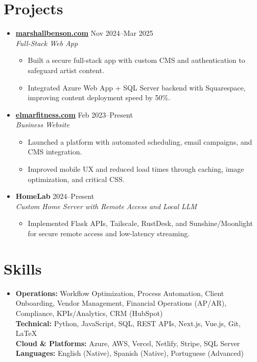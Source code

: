 \documentclass[letterpaper,10pt]{article}
\newcommand{\resumeItem}[1]{\item \small{#1}}
\begin{document}
\section*{Projects}
\begin{itemize}
  \item[]
    \textbf{\href{https://marshallbenson.com}{marshallbenson.com}} \hfill Nov 2024–Mar 2025 \\
    \textit{Full-Stack Web App}
    \begin{itemize}[leftmargin=0.15in]
      \resumeItem{Built a secure full-stack app with custom CMS and authentication to safeguard artist content.}
      \resumeItem{Integrated Azure Web App + SQL Server backend with Squarespace, improving content deployment speed by 50\%.}
    \end{itemize}

  \item[]
    \textbf{\href{https://elmarfitness.com}{elmarfitness.com}} \hfill Feb 2023–Present \\
    \textit{Business Website}
    \begin{itemize}[leftmargin=0.15in]
      \resumeItem{Launched a platform with automated scheduling, email campaigns, and CMS integration.}
      \resumeItem{Improved mobile UX and reduced load times through caching, image optimization, and critical CSS.}
    \end{itemize}

  \item[]
    \textbf{HomeLab} \hfill 2024–Present \\
    \textit{Custom Home Server with Remote Access and Local LLM}
    \begin{itemize}[leftmargin=0.15in]
      \resumeItem{Implemented Flask APIs, Tailscale, RustDesk, and Sunshine/Moonlight for secure remote access and low-latency streaming.}
    \end{itemize}
\end{itemize}

\section*{Skills}
\begin{itemize}[leftmargin=0in]
  \item[]
    \textbf{Operations:} Workflow Optimization, Process Automation, Client Onboarding, Vendor Management, Financial Operations (AP/AR), Compliance, KPIs/Analytics, CRM (HubSpot) \\
    \textbf{Technical:} Python, JavaScript, SQL, REST APIs, Next.js, Vue.js, Git, LaTeX \\
    \textbf{Cloud \& Platforms:} Azure, AWS, Vercel, Netlify, Stripe, SQL Server \\
    \textbf{Languages:} English (Native), Spanish (Native), Portuguese (Advanced)
\end{itemize}
\end{document}
